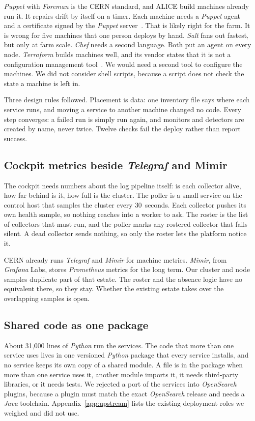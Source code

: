 \textit{Puppet} with \textit{Foreman} is the CERN standard, and ALICE build machines already run it. It repairs drift by itself on a timer. Each machine needs a \textit{Puppet} agent and a certificate signed by the \textit{Puppet} server~\cite{ref:puppetcsr}. That is likely right for the farm. It is wrong for five machines that one person deploys by hand. \textit{Salt} fans out fastest, but only at farm scale. \textit{Chef} needs a second language. Both put an agent on every node. \textit{Terraform} builds machines well, and its vendor states that it is not a configuration management tool~\cite{ref:terraform}. We would need a second tool to configure the machines. We did not consider shell scripts, because a script does not check the state a machine is left in.

Three design rules followed. Placement is data: one inventory file says where each service runs, and moving a service to another machine changed no code. Every step converges: a failed run is simply run again, and monitors and detectors are created by name, never twice. Twelve checks fail the deploy rather than report success.

\subsection{Cockpit metrics beside \textit{Telegraf} and Mimir}\label{sec:why-metrics}

The cockpit needs numbers about the log pipeline itself: is each collector alive, how far behind is it, how full is the cluster. The poller is a small service on the control host that samples the cluster every 30~seconds. Each collector pushes its own health sample, so nothing reaches into a worker to ask. The roster is the list of collectors that must run, and the poller marks any rostered collector that falls silent. A dead collector sends nothing, so only the roster lets the platform notice it.

CERN already runs \textit{Telegraf} and \textit{Mimir} for machine metrics. \textit{Mimir}, from \textit{Grafana} Labs, stores \textit{Prometheus} metrics for the long term. Our cluster and node samples duplicate part of that estate. The roster and the absence logic have no equivalent there, so they stay. Whether the existing estate takes over the overlapping samples is open.

\subsection{Shared code as one package}\label{sec:why-package}

About 31,000 lines of \textit{Python} run the services. The code that more than one service uses lives in one versioned \textit{Python} package that every service installs, and no service keeps its own copy of a shared module. A file is in the package when more than one service uses it, another module imports it, it needs third-party libraries, or it needs tests. We rejected a port of the services into \textit{OpenSearch} plugins, because a plugin must match the exact \textit{OpenSearch} release and needs a \textit{Java} toolchain. Appendix~\ref{app:upstream} lists the existing deployment roles we weighed and did not use.
